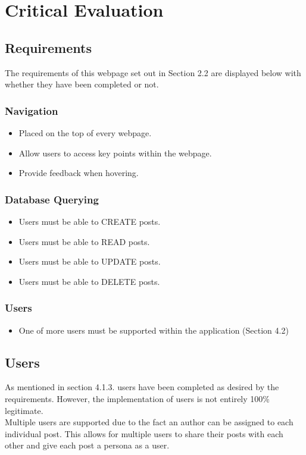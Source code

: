 \documentclass[10pt, a4paper]{article}
\newcommand{\cmark}{\ding{51}}%
\newcommand{\done}{\rlap{$\square$}{\raisebox{2pt}{\large\hspace{1pt}\cmark}}%
\hspace{-2.5pt}}
\begin{document}
\section{Critical Evaluation}
\subsection{Requirements}
	The requirements of this webpage set out in Section 2.2 are displayed below with whether they have been completed or not.
	\subsubsection {Navigation}
	\begin{itemize}
	\item[\done] Placed on the top of every webpage.
	\item[\done] Allow users to access key points within the webpage.
	\item[\done] Provide feedback when hovering.
	\end{itemize}
	\subsubsection {Database Querying}
	\begin{itemize}
	\item[\done] Users must be able to CREATE posts.
	\item[\done] Users must be able to READ posts.
	\item[\done] Users must be able to UPDATE posts.
	\item[\done] Users must be able to DELETE posts.
	\end{itemize}
	\subsubsection {Users}
	\begin{itemize}
	\item[\done] One of more users must be supported within the application (Section 4.2)
	\end{itemize}
\subsection{Users}
As mentioned in section 4.1.3. users have been completed as desired by the requirements.  However, the implementation of users is not entirely 100\% legitimate. \\

Multiple users are supported due to the fact an author can be assigned to each individual post. This allows for multiple users to share their posts with each other and give each post a persona as a user. \\
\end{document}
